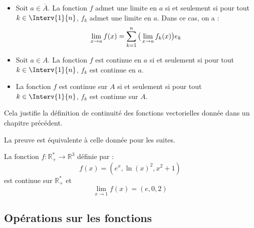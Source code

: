 \documentclass[a4paper,10pt]{report}
\begin{document}
\begin{prop} 

\begin{itemize}
\item Soit $a \in \overline{A}$. La fonction $f$ admet une limite en $a$ si et seulement si pour tout $k \in\Interv{1}{n}$, $f_k$ admet une limite en $a$. Dans ce cas, on a :
$$ \lim_{x \rightarrow a} f(x) =  \sum_{k=1}^n \big{(} \lim_{x \rightarrow a} f_k(x) \big{)} e_k$$
\item Soit $a \in A$. La fonction $f$ est continue en $a$ si et seulement si pour tout $k \in\Interv{1}{n}$, $f_k$ est continue en $a$.
\item La fonction $f$ est continue sur $A$ si et seulement si pour tout $k \in\Interv{1}{n}$, $f_k$ est continue sur $A$.
\end{itemize}
\end{prop}

\begin{rems}
\item Cela justifie la définition de continuité des fonctions vectorielles donnée dans un chapitre précédent.
\item La preuve est équivalente à celle donnée pour les suites.
\end{rems}

\medskip

\begin{ex} La fonction $f : \mathbb{R}_+^* \rightarrow \mathbb{R}^3$ définie par :
$$ f(x) = (e^x, \ln(x)^2, x^2+1)$$
est continue sur $\mathbb{R}_+^*$ et 
$$ \lim_{x \rightarrow 1} f(x) = (e,0,2)$$
\end{ex}
%
%

\subsection{Opérations sur les fonctions}
\end{document}
